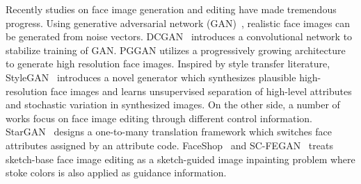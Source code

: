Recently studies on face image generation and editing have made tremendous progress.
Using generative adversarial network (GAN)~\cite{GANs}, realistic face images can be generated from noise vectors.
%
DCGAN~\cite{DCGANs} introduces a convolutional network  to stabilize training of GAN.
PGGAN\cite{PGGAN} utilizes a progressively growing architecture to generate high resolution face images.
Inspired by style transfer literature, StyleGAN~\cite{StyleGAN} introduces a novel generator which synthesizes plausible high-resolution face images and learns unsupervised separation of high-level attributes and stochastic variation in synthesized images. 
%
On the other side, a number of works focus on face image editing through different control information. StarGAN~\cite{StarGAN-CVPR2018} designs a one-to-many translation framework which switches face attributes assigned by an attribute code. FaceShop~\cite{Faceshop-Portenier-TOG18} and SC-FEGAN~\cite{SC-FEGAN-Jo-ICCV2019} treats sketch-base face image editing as a sketch-guided image inpainting problem where stoke colors is also applied as guidance information. 

